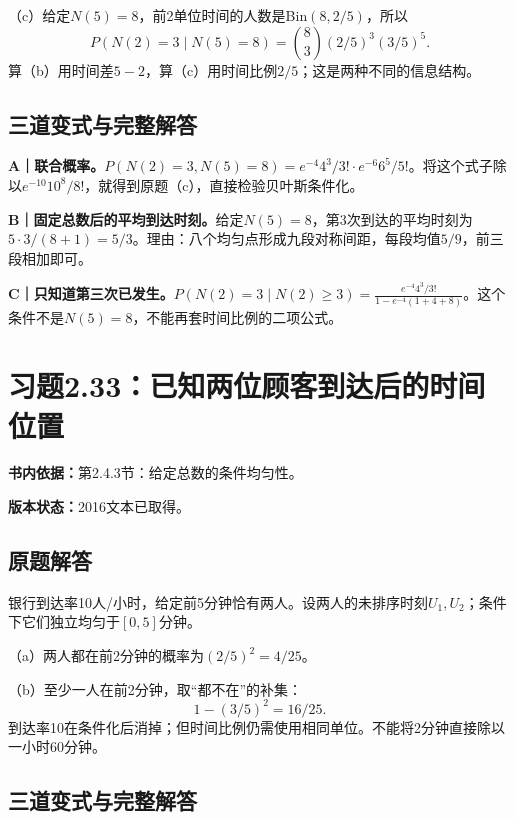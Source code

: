\documentclass[
  11pt,
  a4paper,
  UTF8,fontset=fandol]{ctexart}
\let\OldSection\section
\renewcommand{\section}{\Needspace{7\baselineskip}\OldSection}
\let\OldSubsection\subsection
\renewcommand{\subsection}{\Needspace{5\baselineskip}\OldSubsection}
\begin{document}
（c）给定\(N(5)=8\)，前2单位时间的人数是Bin\((8,2/5)\)，所以
\[\boxed{P(N(2)=3\mid N(5)=8)=\binom83(2/5)^3(3/5)^5.}\]
算（b）用时间差\(5-2\)，算（c）用时间比例\(2/5\)；这是两种不同的信息结构。

\subsection{三道变式与完整解答}\label{ux4e09ux9053ux53d8ux5f0fux4e0eux5b8cux6574ux89e3ux7b54-31}

\textbf{A｜联合概率。}\(P(N(2)=3,N(5)=8)=e^{-4}4^3/3!\cdot e^{-6}6^5/5!\)。将这个式子除以\(e^{-10}10^8/8!\)，就得到原题（c），直接检验贝叶斯条件化。

\textbf{B｜固定总数后的平均到达时刻。}给定\(N(5)=8\)，第3次到达的平均时刻为\(5\cdot3/(8+1)=5/3\)。理由：八个均匀点形成九段对称间距，每段均值\(5/9\)，前三段相加即可。

\textbf{C｜只知道第三次已发生。}\(P(N(2)=3\mid N(2)\ge3)=\frac{e^{-4}4^3/3!}{1-e^{-4}(1+4+8)}\)。这个条件不是\(N(5)=8\)，不能再套时间比例的二项公式。

\newpage

\section{习题2.33：已知两位顾客到达后的时间位置}\label{ux4e60ux98982.33ux5df2ux77e5ux4e24ux4f4dux987eux5ba2ux5230ux8fbeux540eux7684ux65f6ux95f4ux4f4dux7f6e}

\textbf{书内依据：}第2.4.3节：给定总数的条件均匀性。

\textbf{版本状态：}2016文本已取得。

\subsection{原题解答}\label{ux539fux9898ux89e3ux7b54-32}

银行到达率10人/小时，给定前5分钟恰有两人。设两人的未排序时刻\(U_1,U_2\)；条件下它们独立均匀于\([0,5]\)分钟。

（a）两人都在前2分钟的概率为\(\boxed{(2/5)^2=4/25}\)。

（b）至少一人在前2分钟，取``都不在''的补集：
\[\boxed{1-(3/5)^2=16/25}.\]
到达率10在条件化后消掉；但时间比例仍需使用相同单位。不能将2分钟直接除以一小时60分钟。

\subsection{三道变式与完整解答}\label{ux4e09ux9053ux53d8ux5f0fux4e0eux5b8cux6574ux89e3ux7b54-32}
\end{document}
